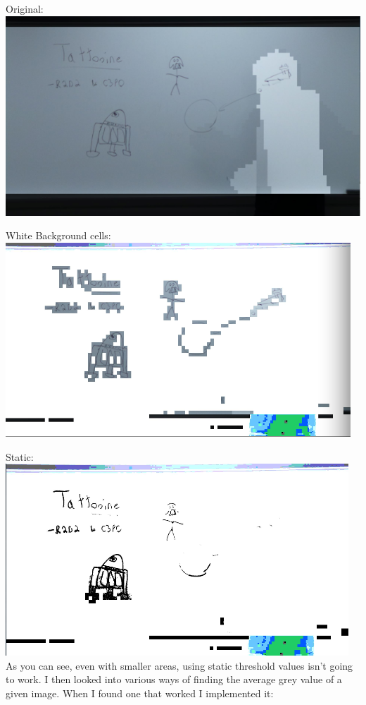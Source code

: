 \documentclass[]{article}
\begin{document}
	Original: \\
	\includegraphics[scale=1]{images/Orig.png}
	
	White Background cells: \\
	\includegraphics[scale=1]{images/WhitBack.png}
	
	Static: \\
	\includegraphics[scale=1]{images/Static.png} \\
	
	
	As you can see, even with smaller areas, using static threshold values isn't going to work.
	I then looked into various ways of finding the average grey value of a given image. When I found one that worked I implemented it:
	
\end{document}
